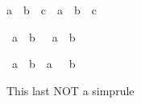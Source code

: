 \begin{isabellebody}
\begin{isamarkuptext}
\begin{isabelle}%
a\ {}\ b\ {}\ c\ {}\ a\ {}\ {}b\ {}\ c{}%
\end{isabelle}

\begin{isabelle}%
{}\ {}a\ {}\ b{}\ {}\ {}\ a\ {}\ b%
\end{isabelle}

\begin{isabelle}%
{}\ {}a\ {}\ b{}\ {}\ a\ {}\ {}\ b%
\end{isabelle}

This last NOT a simprule


\end{isamarkuptext}
\end{isabellebody}
